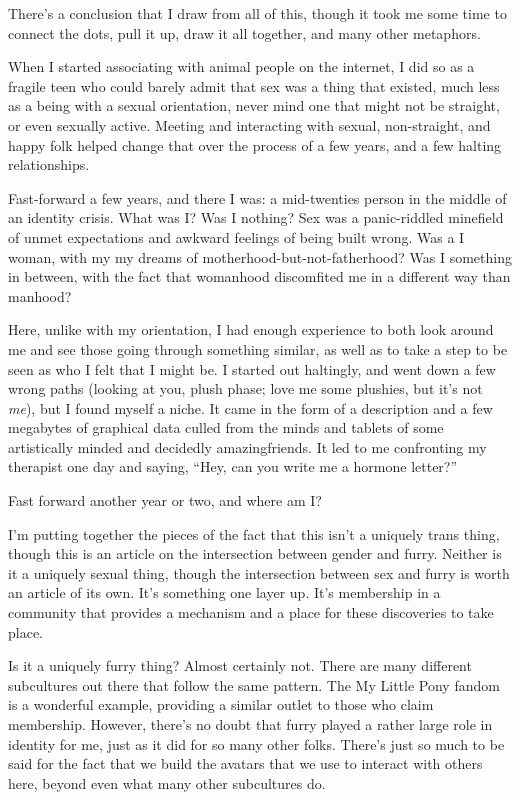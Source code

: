 There's a conclusion that I draw from all of this, though it took me some time to connect the dots, pull it up, draw it all together, and many other metaphors.

When I started associating with animal people on the internet, I did so as a fragile teen who could barely admit that sex was a thing that existed, much less as a being with a sexual orientation, never mind one that might not be straight, or even sexually active.  Meeting and interacting with sexual, non-straight, and happy folk helped change that over the process of a few years, and a few halting relationships.

Fast-forward a few years, and there I was: a mid-twenties person in the middle of an identity crisis.  What was I?  Was I nothing?  Sex was a panic-riddled minefield of unmet expectations and awkward feelings of being built wrong.  Was a I woman, with my my dreams of motherhood-but-not-fatherhood?  Was I something in between, with the fact that womanhood discomfited me in a different way than manhood?

Here, unlike with my orientation, I had enough experience to both look around me and see those going through something similar, as well as to take a step to be seen as who I felt that I might be.  I started out haltingly, and went down a few wrong paths (looking at you, plush phase; love me some plushies, but it's not \textit{me}), but I found myself a niche.  It came in the form of a description and a few megabytes of graphical data culled from the minds and tablets of some artistically minded and decidedly amazingfriends.  It led to me confronting my therapist one day and saying, ``Hey, can you write me a hormone letter?''

Fast forward another year or two, and where am I?

I'm putting together the pieces of the fact that this isn't a uniquely trans thing, though this is an article on the intersection between gender and furry.  Neither is it a uniquely sexual thing, though the intersection between sex and furry is worth an article of its own.  It's something one layer up.  It's membership in a community that provides a mechanism and a place for these discoveries to take place.

Is it a uniquely furry thing?  Almost certainly not.  There are many different subcultures out there that follow the same pattern.  The My Little Pony fandom is a wonderful example, providing a similar outlet to those who claim membership.  However, there's no doubt that furry played a rather large role in identity for me, just as it did for so many other folks.  There's just so much to be said for the fact that we build the avatars that we use to interact with others here, beyond even what many other subcultures do.

